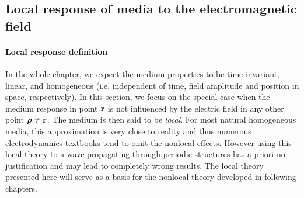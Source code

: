 \subsection{Local response of media to the electromagnetic field} \label{loc_response_of_media}
\paragraph{Local response definition}  %
\label{subsection_local_resp}
In the whole chapter, we expect the medium properties to be time-invariant, linear, and homogeneous (i.e. independent of time, field amplitude and position in space, respectively). 
In this section, we focus on the special case when the medium response in point ${\mathbf{r}}$ is not influenced by the electric field in any other point $\boldsymbol{\rho} \neq {\mathbf{r}}$. The medium is then said to be \textit{local}. 
For most natural homogeneous media, this approximation is very close to reality and thus numerous electrodynamics textbooks tend to omit the nonlocal effects. 
However using this local theory to a wave propagating through periodic structures has a priori no justification and may lead to completely wrong results. The local theory presented here will serve as a basis for the nonlocal theory developed in following chapters.

